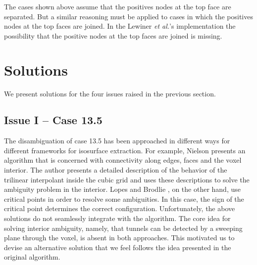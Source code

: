 The cases shown above assume that the positives nodes at the top face are separated. But a similar reasoning must be applied to cases in which the positives nodes at the top faces are joined. In the Lewiner \emph{et al.}'s implementation the possibility that the positive nodes at the top faces are joined is missing. 

\section{Solutions}
\label{sec:solution}
 
We present solutions for the four issues raised in the previous section. 
 
\subsection{Issue I -- Case 13.5}

The disambiguation of case 13.5 has been approached in different ways for different frameworks for isosurface extraction.  For example, Nielson \cite{Nielson03onmarching} presents an algorithm that is  concerned with connectivity along edges, faces and the voxel interior. The author presents a detailed description of the behavior of the trilinear interpolant inside the cubic grid and uses these descriptions to solve the ambiguity problem in the interior. Lopes and Brodlie \cite{lopes:tvcg:2003}, on the other hand, use critical points in order to resolve some ambiguities. In this case, the sign of the critical point determines the correct configuration.
%
Unfortunately, the above solutions do not seamlessly integrate with the \mc{} algorithm. The core idea for solving interior ambiguity, namely, that tunnels can be detected by a sweeping plane through the voxel, is absent in both approaches. This motivated us to devise an alternative solution that we feel follows the idea presented in the original algorithm.

